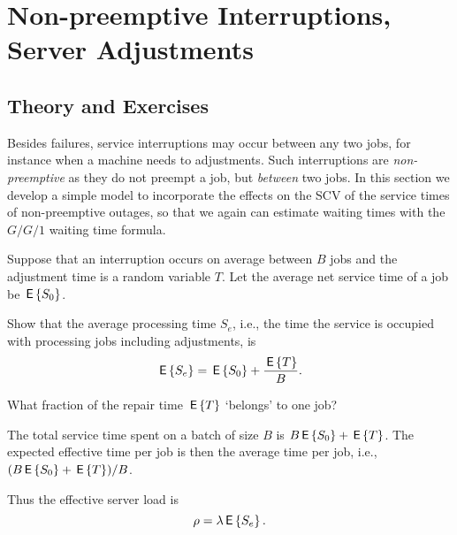 \section{Non-preemptive Interruptions, Server Adjustments}
\label{sec:non-preempt-interr}

\subsection*{Theory and Exercises}



Besides failures, service interruptions  may occur between any two jobs, for instance when a machine needs to adjustments. Such interruptions are \emph{non-preemptive} as they do not preempt a job, 
but  \emph{between} two jobs.  In this section we develop a simple model to incorporate the effects on the SCV of the service times of non-preemptive outages, so that we again can estimate waiting times with the $G/G/1$ waiting time formula. 


Suppose that an interruption occurs on average between $B$ jobs and the adjustment time is a random variable $T$. Let the average net service time of a job be $\,\mathsf{E}\left\{S_0\right\}$. 
\begin{exercise}
  Show that the average  processing time $S_e$, i.e., the time the service is occupied with processing jobs including adjustments, is 
  \begin{equation*}
    \,\mathsf{E}\left\{S_e\right\} = \,\mathsf{E}\left\{S_0\right\} + \frac{\,\mathsf{E}\left\{T\right\}} B.
  \end{equation*}
  \begin{hint}
    What fraction of the repair time $\,\mathsf{E}\left\{T\right\}$ `belongs' to one job?
  \end{hint}
  \begin{solution}
    The total service time spent on a batch of size $B$ is $B \,\mathsf{E}\left\{S_0\right\} + \,\mathsf{E}\left\{T\right\}$. The expected effective time per job is then the average time per job, i.e.,  $(B \,\mathsf{E}\left\{S_0\right\}+\,\mathsf{E}\left\{T\right\})/B$. 
  \end{solution}
\end{exercise}

Thus the effective server load is
\begin{equation*}
  \rho = \lambda \,\mathsf{E}\left\{S_e\right\}.
\end{equation*}

